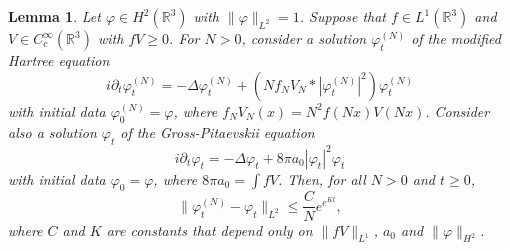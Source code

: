 \documentclass[11pt,a4paper,draft,DIV11]{scrartcl}	%
\newtheorem{lem}[thm]{Lemma}
\newcommand{\R}{\mathds{R}}
\begin{document}
\begin{lem}
\label{lem:phitN2phit}
  Let $\varphi \in H^2(\R^3)$ with $\| \varphi \|_{L^2} = 1$. Suppose that $f
  \in L^1(\R^3)$ and $V \in C_c^\infty(\R^3)$ with $fV \ge 0$. For $N > 0$,
  consider a solution $\varphi_t^{(N)}$ of the modified Hartree equation
  \[
    i \partial_t \varphi_t^{(N)} = - \Delta \varphi_t^{(N)} + (N f_N V_N *
    |\varphi_t^{(N)}|^2) \varphi_t^{(N)}
  \]
  with initial data $\varphi^{(N)}_0 = \varphi$, where $f_N V_N(x) = N^2
  f(Nx)V(Nx)$. Consider also a solution $\varphi_t$ of the Gross-Pitaevskii equation
  \[
    i \partial_t \varphi_t = - \Delta \varphi_t + 8 \pi a_0 |\varphi_t|^2
    \varphi_t
  \]
  with initial data $\varphi_0 = \varphi$, where $8 \pi a_0 = \int f V$. Then,
  for all $N > 0$ and $t \ge 0$,
  \[
    \| \varphi_t^{(N)} - \varphi_t \|_{L^2} \le \frac{C}{N} e^{e^{K t}},
  \]
  where $C$ and $K$ are constants that depend only on $\| fV \|_{L^1}$,
  $a_0$ and $\| \varphi \|_{H^2}$.
\end{lem}
\end{document}
